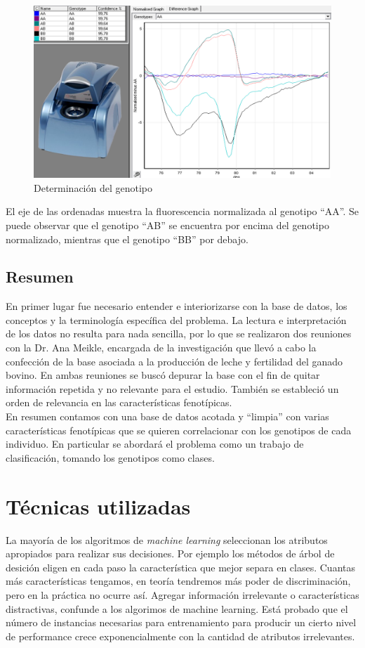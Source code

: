 \documentclass[12pt,a4paper,titlepage]{report}
\begin{document}
\begin{figure}[H]
	\centering 
	\includegraphics[width=.8\textwidth]{./pics/genotipos.png}
	\caption{Determinación del genotipo}
	\label{fig:genotipo}
\end{figure}

El eje de las ordenadas muestra la fluorescencia normalizada al genotipo ``AA''. Se puede observar que el genotipo ``AB'' se encuentra por encima del genotipo normalizado, mientras que el genotipo ``BB'' por debajo.

\section{Resumen}
En primer lugar fue necesario entender e interiorizarse con la base de datos, los conceptos y la terminología específica del problema. La lectura e interpretación de los datos no resulta para nada sencilla, por lo que se realizaron dos reuniones con la Dr. Ana Meikle, encargada de la investigación que llevó a cabo la confección de la base asociada a la producción de leche y fertilidad del ganado bovino. En ambas reuniones se buscó depurar la base con el fin de quitar información repetida y no relevante para el estudio. También se estableció un orden de relevancia en las características fenotípicas.\\

En resumen contamos con una base de datos acotada y ``limpia'' con varias características fenotípicas que se quieren correlacionar con los genotipos de cada individuo. En particular se abordará el problema como un trabajo de clasificación, tomando los genotipos como clases.

\chapter{Técnicas utilizadas}
La mayoría de los algoritmos de \emph{machine learning} seleccionan los atributos apropiados para realizar sus decisiones. Por ejemplo los métodos de árbol de desición eligen en cada paso la característica que mejor separa en clases. Cuantas más características tengamos, en teoría tendremos más poder de discriminación, pero en la práctica no ocurre así. Agregar información irrelevante o características distractivas, confunde a los algorimos de machine learning. Está probado que el número de instancias necesarias para entrenamiento para producir un cierto nivel de performance crece exponencialmente con la cantidad de atributos irrelevantes.\\
\end{document}
